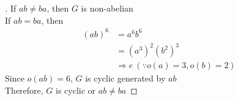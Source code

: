 \documentclass[paper=usletter, fontsize=12pt]{article}
\begin{document}
\begin{itemize}
\begin{itemize}
\begin{proof}[\unskip\nopunct]
                If $ab \neq ba$, then $G$ is non-abelian\\
                If $ab = ba$, then\\
                \begin{align*}
                    (ab)^6 & = a^6b^6\\
                    & = (a^3)^2(b^2)^3\\
                    & \Rightarrow e \ (\because o(a) = 3, o(b) = 2)
                \end{align*}
                Since $o(ab)=6$, $G$ is cyclic generated by $ab$\\
                Therefore, $G$ is cyclic or $ab \neq ba$ \qedhere

            \end{proof}
            \vspace{0.2in}

        \end{itemize}

    \end{itemize}
\end{document}
